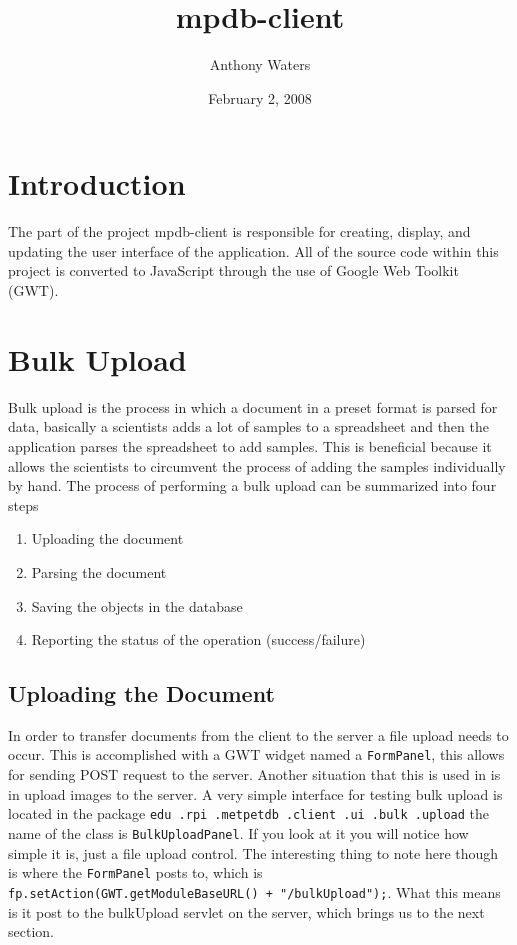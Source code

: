 \documentclass[10pt,letterpaper,onecolumn,oneside]{report}
\begin{document}
\title{mpdb-client}
\author{Anthony Waters}
\date{February 2, 2008}
\maketitle
\tableofcontents
\newpage
\section{Introduction}
The part of the project mpdb-client is responsible for creating, display, and updating the user interface of the application.  All of the source code within this project is converted to JavaScript through the use of Google Web Toolkit (GWT).
\section{Bulk Upload}
Bulk upload is the process in which a document in a preset format is parsed for data, basically a scientists adds a lot of samples to a spreadsheet and then the application parses the spreadsheet to add samples.  This is beneficial because it allows the scientists to circumvent the process of adding the samples individually by hand.  The process of performing a bulk upload can be summarized into four steps
\begin{enumerate}
\item Uploading the document
\item Parsing the document
\item Saving the objects in the database
\item Reporting the status of the operation (success/failure)
\end{enumerate}
\subsection{Uploading the Document}
In order to transfer documents from the client to the server a file upload needs to occur.  This is accomplished with a GWT widget named a
\texttt{FormPanel}, this allows for sending POST request to the server.  Another situation that this is used in is in upload images to the server.  A very simple interface for testing bulk upload is located in the package 
\texttt{edu\ .rpi\ .metpetdb\ .client\ .ui\ .bulk\ .upload} the name of the class is
\texttt{BulkUploadPanel}.  If you look at it you will notice how simple it is, just a file upload control.  The interesting thing to note here though is where the \texttt{FormPanel} posts to, which is \texttt{fp.setAction(GWT.getModuleBaseURL() + "/bulkUpload");}.  What this means is it post to the bulkUpload servlet on the server, which brings us to the next section.
\end{document}
